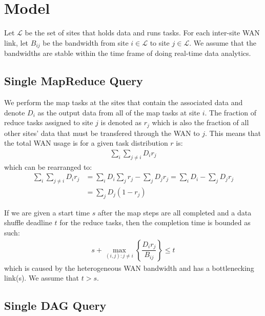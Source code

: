 \section{Model}
\label{sec:model}

Let $\mathcal{L}$ be the set of sites that holds data and runs tasks.
For each inter-site WAN link, let $B_{ij}$ be the bandwidth from site $i\in\mathcal{L}$ to site $j\in\mathcal{L}$.
We assume that the bandwidths are stable within the time frame of doing real-time data analytics.

\subsection{Single MapReduce Query}
We perform the map tasks at the sites that contain the associated data and denote $D_{i}$ as the output data from all of the map tasks at site $i$.
The fraction of reduce tasks assigned to site $j$ is denoted as $r_{j}$ which is also the fraction of all other sites' data that must be transfered through the WAN to $j$.
This means that the total WAN usage is for a given task distribution $r$ is:
\begin{align}
	\sum_{i}\sum_{j\neq i}D_{i}r_{j}
\end{align}
which can be rearranged to:
\begin{align}
	\sum_{i}\sum_{j\neq i}D_ir_j & = \sum_{i}D_i\sum_{j}r_j - \sum_{j}D_jr_j =\sum_{i}D_i - \sum_{j}D_jr_j \\
	& =\sum_{j}D_j(1-r_j)
\end{align}

If we are given a start time $s$ after the map steps are all completed and a data shuffle deadline $t$ for the reduce tasks, then the completion time is bounded as such:
\begin{align}
	s + \max_{(i,j):j\neq i} \left\{\dfrac{D_{i}r_{j}}{B_{ij}}\right\} \leq t
\end{align}
which is caused by the heterogeneous WAN bandwidth and has a bottlenecking link(s).
We assume that $t>s$.

\subsection{Single DAG Query}

